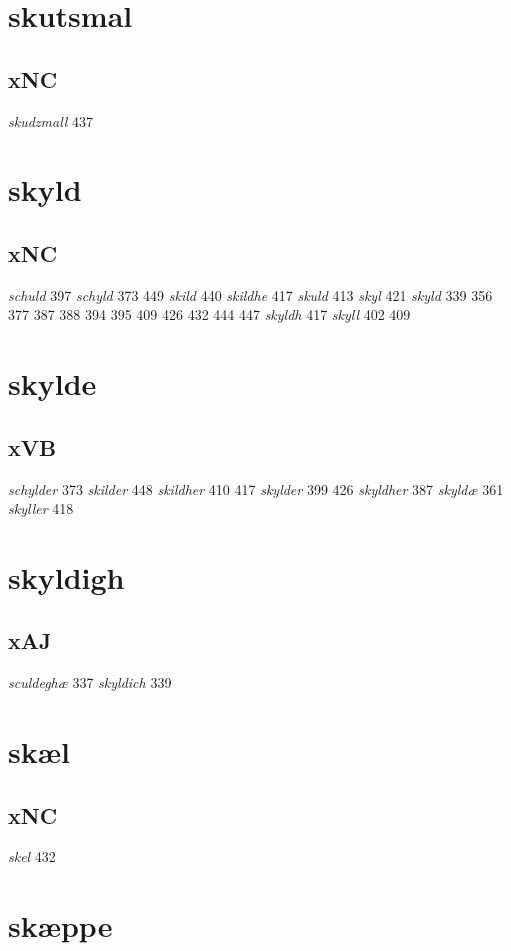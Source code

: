 \documentclass[a4paper,twocolumn]{article}
\begin{document}
\section{skutsmal}
\label{sec:org019269c}
\subsection{xNC}
\label{sec:orgf1b5d5f}
\emph{skudzmall} 437 
\section{skyld}
\label{sec:orge1dc664}
\subsection{xNC}
\label{sec:orgee60ceb}
\emph{schuld} 397 \emph{schyld} 373 449 \emph{skild} 440 \emph{skildhe} 417 \emph{skuld} 413 \emph{skyl} 421 \emph{skyld} 339 356 377 387 388 394 395 409 426 432 444 447 \emph{skyldh} 417 \emph{skyll} 402 409 
\section{skylde}
\label{sec:orge252602}
\subsection{xVB}
\label{sec:orgb2b3337}
\emph{schylder} 373 \emph{skilder} 448 \emph{skildher} 410 417 \emph{skylder} 399 426 \emph{skyldher} 387 \emph{skyldæ} 361 \emph{skyller} 418 
\section{skyldigh}
\label{sec:org5fb83fe}
\subsection{xAJ}
\label{sec:orgdf2e38b}
\emph{sculdeghæ} 337 \emph{skyldich} 339 
\section{skæl}
\label{sec:org3630d78}
\subsection{xNC}
\label{sec:org024df9d}
\emph{skel} 432 
\section{skæppe}
\label{sec:org5c6a764}
\end{document}
